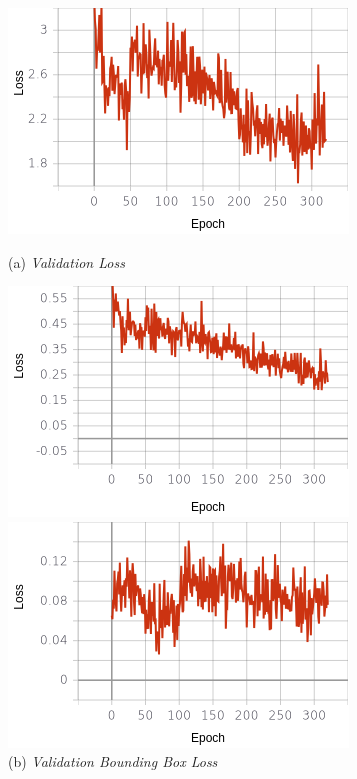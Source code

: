 \begin{figure}[H]
	\centering
	\begin{minipage}{0.45\textwidth}
		\includegraphics[width=\textwidth]{gambar/training_resnet50/tugas-akhir-Page 19.png}
		\caption*{(a) \textit{Validation Loss}}
	\end{minipage}
	\hfill
	\begin{minipage}{0.45\textwidth}
		\includegraphics[width=\textwidth]{gambar/training_resnet50/tugas-akhir-Page 19 (1).png}
		\caption*{(b) \textit{Validation Bounding Box Loss}}
	\end{minipage}
	\vfill
	\begin{minipage}{0.45\textwidth}
		\includegraphics[width=\textwidth]{gambar/training_resnet50/tugas-akhir-Page 19 (2).png}

\end{minipage}
\end{figure}
